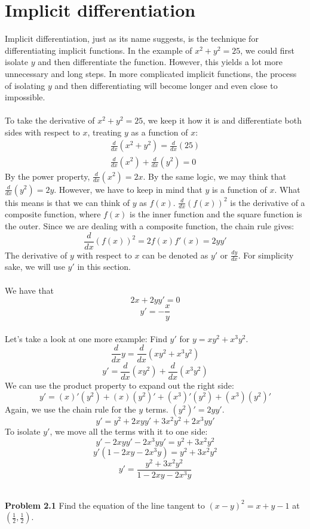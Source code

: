\documentclass[11pt]{scrartcl}
\begin{document}
\section{Implicit differentiation}
Implicit differentiation, just as its name suggests, is the technique for differentiating implicit functions. In the example of $x^2+y^2=25$, we could first isolate $y$ and then differentiate the function. However, this yields a lot more unnecessary and long steps. In more complicated implicit functions, the process of isolating $y$ and then differentiating will become longer and even close to impossible. \\
\noindent\\
To take the derivative of $x^2+y^2=25$, we keep it how it is and differentiate both sides with respect to $x$, treating $y$ as a function of $x$:
\begin{align*}
    \frac{d}{dx}(x^2+y^2)=\frac{d}{dx}(25)\\
    \frac{d}{dx}(x^2)+\frac{d}{dx}(y^2)=0
\end{align*}
By the power property, $\frac{d}{dx}(x^2)=2x$. By the same logic, we may think that $\frac{d}{dx}(y^2)=2y$. However, we have to keep in mind that $y$ is a function of $x$. What this means is that we can think of $y$ as $f(x)$. $\frac{d}{dx}(f(x))^2$ is the derivative of a composite function, where $f(x)$ is the inner function and the square function is the outer. Since we are dealing with a composite function, the chain rule gives: 
$$\frac{d}{dx}(f(x))^2=2f(x)f'(x)=2yy'$$
The derivative of $y$ with respect to $x$ can be denoted as $y'$ or $\frac{dy}{dx}$. For simplicity sake, we will use $y'$ in this section.\\
\noindent\\
We have that 
$$2x+2yy'=0$$
$$y'=-\frac{x}{y}$$\\
\noindent
Let's take a look at one more example: Find $y'$ for $y=xy^2+x^3y^2$.\\
$$\frac{d}{dx}y=\frac{d}{dx}(xy^2+x^3y^2)$$
$$y'=\frac{d}{dx}(xy^2)+\frac{d}{dx}(x^3y^2)$$
We can use the product property to expand out the right side:
$$y'=(x)'(y^2)+(x)(y^2)'+(x^3)'(y^2)+(x^3)(y^2)'$$
Again, we use the chain rule for the $y$ terms. $(y^2)'=2yy'$.
$$y'=y^2+2xyy'+3x^2y^2+2x^3yy'$$
To isolate $y'$, we move all the terms with it to one side:
$$y'-2xyy'-2x^3yy'=y^2+3x^2y^2$$
$$y'(1-2xy-2x^3y)=y^2+3x^2y^2$$
$$y'=\frac{y^2+3x^2y^2}{1-2xy-2x^3y}$$\\
\begin{tcolorbox}
[colback=purple!5!white,colframe=purple!75!black]
\textbf{Problem 2.1} Find the equation of the line tangent to $(x-y)^2=x+y-1$ at $\left(\frac{1}{2}, \frac{1}{2}\right)$.
\end{tcolorbox}
\end{document}
